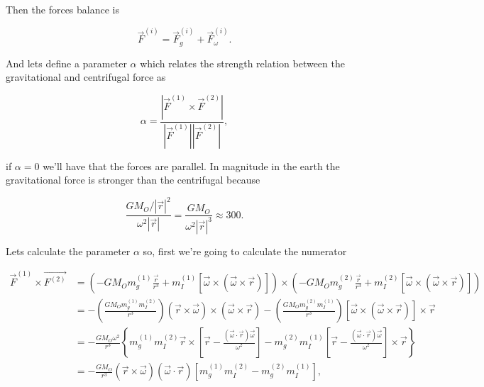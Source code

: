             Then the forces balance is

            \begin{equation*}
                \Vec{F}^{(i)} = \Vec{F}_g^{(i)} + \Vec{F}_{\omega}^{(i)}.
            \end{equation*}

            And lets define a parameter $\alpha$ which relates the strength relation between the gravitational and centrifugal force as

            \begin{equation}
                \alpha = \frac{\left| \Vec{F}^{(1)} \times \Vec{F}^{(2)} \right|}{|\Vec{F}^{(1)}||\Vec{F}^{(2)}|},
            \end{equation}

            if $\alpha = 0$ we'll have that the forces are parallel. In magnitude in the earth the gravitational force is stronger than the centrifugal because 

            \begin{equation*}
                \frac{GM_O/|\Vec{r}|^2}{\omega^2|\Vec{r}|} = \frac{GM_O}{\omega^2|\Vec{r}|^3}\approx 300.
            \end{equation*}

            Lets calculate the parameter $\alpha$ so, first we're going to calculate the numerator

            \begin{align*}
                \Vec{F}^{(1)}\times\Vec{F^{(2)}} &= \left( -GM_Om_g^{(1)}\frac{\Vec{r}}{r^3} + m_I^{(1)} \left[\Vec{\omega}\times (\Vec{\omega}\times \Vec{r})\right] \right) \times \left( -GM_Om_g^{(2)}\frac{\Vec{r}}{r^3} + m_I^{(2)} \left[\Vec{\omega}\times (\Vec{\omega}\times \Vec{r})\right] \right)\\
                &= - \left(\frac{GM_Om_g^{(1)}m_I^{(2)}}{r^3}\right)(\Vec{r}\times\Vec{\omega})\times(\Vec{\omega}\times\Vec{r}) - \left(\frac{GM_Om_g^{(2)}m_I^{(1)}}{r^3}\right)\left[\Vec{\omega}\times(\Vec{\omega}\times\Vec{r})\right]\times\Vec{r}\\
                &= -\frac{GM_O\omega^2}{r^3}\left\{m_g^{(1)}m_I^{(2)}\Vec{r}\times \left[\Vec{r} - \frac{(\Vec{\omega}\cdot\Vec{r})\Vec{\omega}}{\omega^2}\right] - m_g^{(2)}m_I^{(1)}\left[\Vec{r} - \frac{(\Vec{\omega}\cdot\Vec{r})\Vec{\omega}}{\omega^2}\right] \times \Vec{r} \right\}\\
                &= -\frac{GM_O}{r^3}(\Vec{r}\times\Vec{\omega})(\Vec{\omega}\cdot\Vec{r})[m_g^{(1)}m_I^{(2)} - m_g^{(2)}m_I^{(1)}],
            \end{align*}

